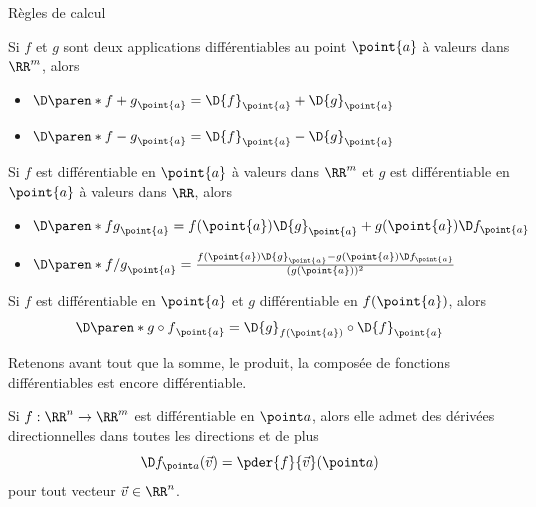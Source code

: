 \begin{frame}{Règles de calcul}
  \begin{proposition}Si \(f\) et \(g\) sont deux applications différentiables au point \(\point{a}\) à valeurs dans \(\RR^m\), alors\pause{}
    \begin{itemize}[<+->]
    \item \(\D\paren*{f+g}_{\point{a}} = \D{f}_{\point{a}} + \D{g}_{\point{a}}\)
    \item \(\D\paren*{f-g}_{\point{a}} = \D{f}_{\point{a}} - \D{g}_{\point{a}}\)
    \end{itemize}\pause{}
    Si \(f\) est différentiable en \(\point{a}\) à valeurs dans \(\RR^m\) et\pause{} \(g\) est différentiable en \(\point{a}\) à valeurs dans \(\RR\), alors
    \begin{itemize}[<+->]
    \item \(\D\paren*{fg}_{\point{a}} = f(\point{a}) \D{g}_{\point{a}} + g(\point{a}) \D f_{\point{a}} \)
    \item \(\D\paren*{f/g}_{\point{a}} = \frac{f(\point{a}) \D{g}_{\point{a}} - g(\point{a}) \D f_{\point{a}}}{(g(\point{a}))^{2}} \)
    \end{itemize}
    Si \(f\) est différentiable en \(\point{a}\) et \(g\) différentiable en \(f(\point{a})\), alors
    \begin{equation*}
      \D\paren*{g\circ f}_{\point{a}} = \D{g}_{f(\point{a})}\circ \D{f}_{\point{a}}
    \end{equation*}
  \end{proposition}\pause{}
  \begin{remark*}
    Retenons avant tout que la somme, le produit, la composée de fonctions différentiables est encore différentiable.
  \end{remark*}
\end{frame}

\begin{frame}
  \begin{proposition}
    Si \(f: \RR^n \to \RR^m\) est différentiable en \(\point a\),\pause{} alors elle admet des dérivées directionnelles dans toutes les directions et de plus\pause{}
    \begin{equation*}
      \D f_{\point a}(\vec v) = \pder{f}{\vec v}(\point a)
    \end{equation*}
    pour tout vecteur \(\vec v\in\RR^{n}\).\pause{}
  \end{proposition}
\end{frame}


